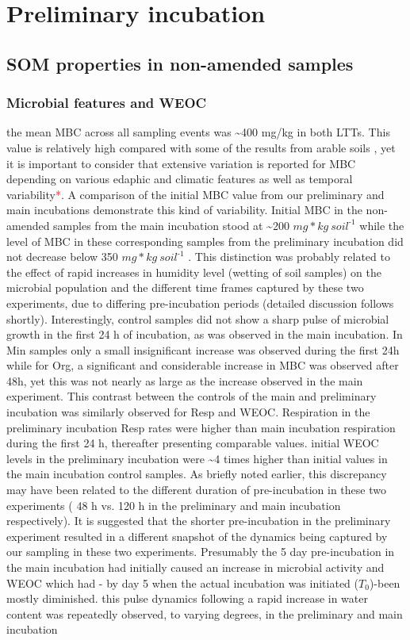 \documentclass[12pt]{report}
\newcommand{\myRed}[1]{\textcolor{red}{#1}} %
\newlength{\SpaceAfterUnit}
\newcommand{\genericunit}{$ mg * kg\ soil^{\text{-}1}$ \hspace*{\SpaceAfterUnit}}
\begin{document}
\section{Preliminary incubation}
	
	\subsection{SOM properties in non-amended samples}
		
		\subsubsection{Microbial features and WEOC}		
			the mean MBC across all sampling events was \~{}400 mg/kg in both LTTs. This value is relatively high compared with some of the results from arable soils \citep{jat2020, haynes1999,garcia-orenes2010}, yet it is important to consider that extensive variation is reported for MBC depending on various edaphic and climatic features as well as temporal variability\myRed{*}. A comparison of the initial MBC value from our preliminary and main incubations demonstrate this kind of variability. Initial MBC in the non-amended samples from the main incubation stood at \~{}200 \genericunit while the level of MBC in these corresponding samples from the preliminary incubation did not decrease below 350 \genericunit. This distinction was probably related to the effect of rapid increases in humidity level (wetting of soil samples) on the microbial population and the different time frames captured by these two experiments, due to differing pre-incubation periods (detailed discussion follows shortly). Interestingly, control samples did not show a sharp pulse of microbial growth in the first 24 h of incubation, as was observed in the main incubation. In Min samples only a small insignificant increase was observed during the first 24h while for Org, a significant and considerable increase in MBC was observed after 48h, yet this was  not nearly as large as the increase observed in the main experiment. This contrast between the controls of the main and preliminary incubation was similarly observed for Resp and WEOC. Respiration in the preliminary incubation Resp rates were higher than main incubation respiration during the first 24 h, thereafter presenting comparable values. initial WEOC levels in the preliminary incubation were \~{}4 times higher than initial values in the main incubation control samples. As briefly noted earlier, this discrepancy may have been related to the different duration of pre-incubation in these two experiments ( 48 h vs. 120 h in the preliminary and main incubation respectively). It is suggested that the shorter pre-incubation in the preliminary experiment resulted in a different snapshot of the dynamics being captured by our sampling in these two experiments. Presumably the 5 day pre-incubation in the main incubation had initially caused an increase in microbial activity and WEOC which had - by day 5 when the actual incubation was initiated ($ T_0 $)-been mostly diminished. this pulse dynamics following a rapid increase in water content was repeatedly observed, to varying degrees, in the preliminary and main incubation 
\end{document}
